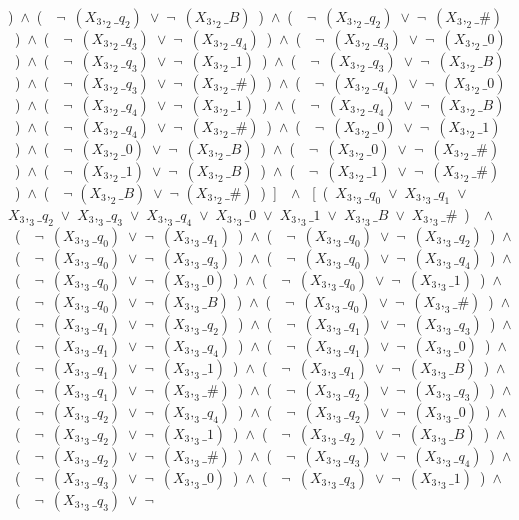 ﻿\documentclass[a4paper,10pt]{article}
\begin{document}
)\ $\wedge$\ (\ \ $\neg$\ $(X_3,_2\_q_2)$\ $\vee$\ $\neg$\ $(X_3,_2\_B)$\ )\ $\wedge$\ (\ \ $\neg$\ $(X_3,_2\_q_2)$\ $\vee$\ $\neg$\ $(X_3,_2\_\#)$\ )\ $\wedge$\ (\ \ $\neg$\ $(X_3,_2\_q_3)$\ $\vee$\ $\neg$\ $(X_3,_2\_q_4)$\ )\ $\wedge$\ (\ \ $\neg$\ $(X_3,_2\_q_3)$\ $\vee$\ $\neg$\ $(X_3,_2\_0)$\ )\ $\wedge$\ (\ \ $\neg$\ $(X_3,_2\_q_3)$\ $\vee$\ $\neg$\ $(X_3,_2\_1)$\ )\ $\wedge$\ (\ \ $\neg$\ $(X_3,_2\_q_3)$\ $\vee$\ $\neg$\ $(X_3,_2\_B)$\ )\ $\wedge$\ (\ \ $\neg$\ $(X_3,_2\_q_3)$\ $\vee$\ $\neg$\ $(X_3,_2\_\#)$\ )\ $\wedge$\ (\ \ $\neg$\ $(X_3,_2\_q_4)$\ $\vee$\ $\neg$\ $(X_3,_2\_0)$\ )\ $\wedge$\ (\ \ $\neg$\ $(X_3,_2\_q_4)$\ $\vee$\ $\neg$\ $(X_3,_2\_1)$\ )\ $\wedge$\ (\ \ $\neg$\ $(X_3,_2\_q_4)$\ $\vee$\ $\neg$\ $(X_3,_2\_B)$\ )\ $\wedge$\ (\ \ $\neg$\ $(X_3,_2\_q_4)$\ $\vee$\ $\neg$\ $(X_3,_2\_\#)$\ )\ $\wedge$\ (\ \ $\neg$\ $(X_3,_2\_0)$\ $\vee$\ $\neg$\ $(X_3,_2\_1)$\ )\ $\wedge$\ (\ \ $\neg$\ $(X_3,_2\_0)$\ $\vee$\ $\neg$\ $(X_3,_2\_B)$\ )\ $\wedge$\ (\ \ $\neg$\ $(X_3,_2\_0)$\ $\vee$\ $\neg$\ $(X_3,_2\_\#)$\ )\ $\wedge$\ (\ \ $\neg$\ $(X_3,_2\_1)$\ $\vee$\ $\neg$\ $(X_3,_2\_B)$\ )\ $\wedge$\ (\ \ $\neg$\ $(X_3,_2\_1)$\ $\vee$\ $\neg$\ $(X_3,_2\_\#)$\ )\ $\wedge$\ (\ \ $\neg$ $(X_3,_2\_B)$\ $\vee$\ $\neg$ $(X_3,_2\_\#)$\ )\ ]\ \ $\wedge$ \ [\ (\ $X_3,_3\_q_0$\ $\vee$\ $X_3,_3\_q_1$\ $\vee$\ $X_3,_3\_q_2$\ $\vee$\ $X_3,_3\_q_3$\ $\vee$\ $X_3,_3\_q_4$\ $\vee$\ $X_3,_3\_0$\ $\vee$\ $X_3,_3\_1$\ $\vee$\ $X_3,_3\_B$\ $\vee$\ $X_3,_3\_\#$\ )\ \ $\wedge$ \ (\ \ $\neg$\ $(X_3,_3\_q_0)$\ $\vee$\ $\neg$\ $(X_3,_3\_q_1)$\ )\ $\wedge$\ (\ \ $\neg$\ $(X_3,_3\_q_0)$\ $\vee$\ $\neg$\ $(X_3,_3\_q_2)$\ )\ $\wedge$\ (\ \ $\neg$\ $(X_3,_3\_q_0)$\ $\vee$\ $\neg$\ $(X_3,_3\_q_3)$\ )\ $\wedge$\ (\ \ $\neg$\ $(X_3,_3\_q_0)$\ $\vee$\ $\neg$\ $(X_3,_3\_q_4)$\ )\ $\wedge$\ (\ \ $\neg$\ $(X_3,_3\_q_0)$\ $\vee$\ $\neg$\ $(X_3,_3\_0)$\ )\ $\wedge$\ (\ \ $\neg$\ $(X_3,_3\_q_0)$\ $\vee$\ $\neg$\ $(X_3,_3\_1)$\ )\ $\wedge$\ (\ \ $\neg$\ $(X_3,_3\_q_0)$\ $\vee$\ $\neg$\ $(X_3,_3\_B)$\ )\ $\wedge$\ (\ \ $\neg$\ $(X_3,_3\_q_0)$\ $\vee$\ $\neg$\ $(X_3,_3\_\#)$\ )\ $\wedge$\ (\ \ $\neg$\ $(X_3,_3\_q_1)$\ $\vee$\ $\neg$\ $(X_3,_3\_q_2)$\ )\ $\wedge$\ (\ \ $\neg$\ $(X_3,_3\_q_1)$\ $\vee$\ $\neg$\ $(X_3,_3\_q_3)$\ )\ $\wedge$\ (\ \ $\neg$\ $(X_3,_3\_q_1)$\ $\vee$\ $\neg$\ $(X_3,_3\_q_4)$\ )\ $\wedge$\ (\ \ $\neg$\ $(X_3,_3\_q_1)$\ $\vee$\ $\neg$\ $(X_3,_3\_0)$\ )\ $\wedge$\ (\ \ $\neg$\ $(X_3,_3\_q_1)$\ $\vee$\ $\neg$\ $(X_3,_3\_1)$\ )\ $\wedge$\ (\ \ $\neg$\ $(X_3,_3\_q_1)$\ $\vee$\ $\neg$\ $(X_3,_3\_B)$\ )\ $\wedge$\ (\ \ $\neg$\ $(X_3,_3\_q_1)$\ $\vee$\ $\neg$\ $(X_3,_3\_\#)$\ )\ $\wedge$\ (\ \ $\neg$\ $(X_3,_3\_q_2)$\ $\vee$\ $\neg$\ $(X_3,_3\_q_3)$\ )\ $\wedge$\ (\ \ $\neg$\ $(X_3,_3\_q_2)$\ $\vee$\ $\neg$\ $(X_3,_3\_q_4)$\ )\ $\wedge$\ (\ \ $\neg$\ $(X_3,_3\_q_2)$\ $\vee$\ $\neg$\ $(X_3,_3\_0)$\ )\ $\wedge$\ (\ \ $\neg$\ $(X_3,_3\_q_2)$\ $\vee$\ $\neg$\ $(X_3,_3\_1)$\ )\ $\wedge$\ (\ \ $\neg$\ $(X_3,_3\_q_2)$\ $\vee$\ $\neg$\ $(X_3,_3\_B)$\ )\ $\wedge$\ (\ \ $\neg$\ $(X_3,_3\_q_2)$\ $\vee$\ $\neg$\ $(X_3,_3\_\#)$\ )\ $\wedge$\ (\ \ $\neg$\ $(X_3,_3\_q_3)$\ $\vee$\ $\neg$\ $(X_3,_3\_q_4)$\ )\ $\wedge$\ (\ \ $\neg$\ $(X_3,_3\_q_3)$\ $\vee$\ $\neg$\ $(X_3,_3\_0)$\ )\ $\wedge$\ (\ \ $\neg$\ $(X_3,_3\_q_3)$\ $\vee$\ $\neg$\ $(X_3,_3\_1)$\ )\ $\wedge$\ (\ \ $\neg$\ $(X_3,_3\_q_3)$\ $\vee$\ $\neg$\ 
\end{document}
